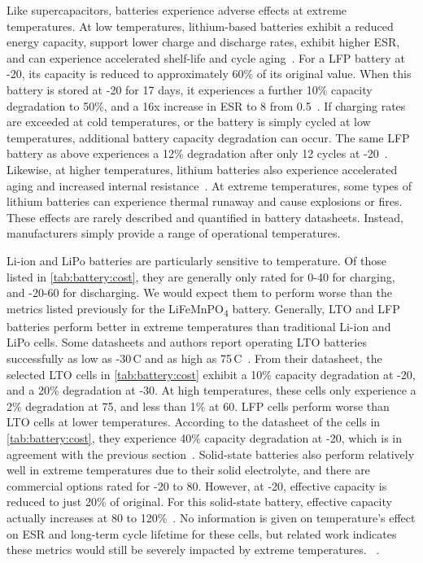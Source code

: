 Like supercapacitors, batteries experience adverse effects at extreme temperatures. At low temperatures, lithium-based batteries exhibit a reduced energy capacity, support lower charge and discharge rates, exhibit higher ESR, and can experience accelerated shelf-life and cycle aging~\cite{jaguemont2015lithium}. For a LFP battery at -20\ssi{\celsius}, its capacity is reduced to approximately 60\% of its original value. When this battery is stored at -20\ssi{\celsius} for 17 days, it experiences a further 10\% capacity degradation to 50\%, and a 16x increase in ESR to 8\ssi{\milli\ohm} from 0.5\ssi{\milli\ohm}~\cite{jaguemont2015lithium}.
If charging rates are exceeded at cold temperatures, or the battery is simply cycled at low temperatures, additional battery capacity degradation can occur. The same LFP battery as above experiences a 12\% degradation after only 12 cycles at -20\ssi{\celsius}~\cite{jaguemont2015lithium}.
Likewise, at higher temperatures, lithium batteries also experience accelerated aging and increased internal resistance~\cite{leng2015effect}. At extreme temperatures, some types of lithium batteries can experience thermal runaway and cause explosions or fires. These effects are rarely described and quantified in battery datasheets. Instead, manufacturers simply provide a range of operational temperatures.

Li-ion and LiPo batteries are particularly sensitive to temperature. Of those listed in \cref{tab:battery:cost}, they are generally only rated for 0-40\ssi{\celsius} for charging, and -20-60\ssi{\celsius} for discharging. We would expect them to perform worse than the metrics listed previously for the LiFeMnPO\textsubscript{4} battery.
Generally, LTO and LFP batteries perform better in extreme temperatures than traditional Li-ion and LiPo cells.
Some 
datasheets and authors report operating LTO batteries successfully as low as -30\,\textdegree C
and as high as 75\,\textdegree C~\cite{LTODatasheet2, lifepo4Datasheet, chenEvaluation15}. From their datasheet, the selected LTO cells in \cref{tab:battery:cost} exhibit a 10\% capacity degradation at -20\ssi{\celsius}, and a 20\% degradation at -30\ssi{\celsius}. At high temperatures, these cells only experience a 2\% degradation at 75\ssi{\celsius}, and less than 1\% at 60\ssi{\celsius}. LFP cells perform worse than LTO cells at lower temperatures. According to the datasheet of the cells in \cref{tab:battery:cost}, they experience 40\% capacity degradation at -20\ssi{\celsius}, which is in agreement with the previous section~\cite{lifepo4Datasheet, jaguemont2015lithium}. Solid-state batteries also perform relatively well in extreme temperatures due to their solid electrolyte, and there are commercial options rated for -20 to 80\ssi{\celsius}. However, at -20\ssi{\celsius}, effective capacity is reduced to just 20\% of original. For this solid-state battery, effective capacity actually increases at 80\ssi{\celsius} to 120\%~\cite{tdkCeraCharge}.
No information is given on temperature's effect on ESR and long-term cycle lifetime for these cells, but related work indicates these metrics would still be severely impacted by extreme temperatures.
~\cite{wangCycle11, swierczynskiInvestigation14}.

